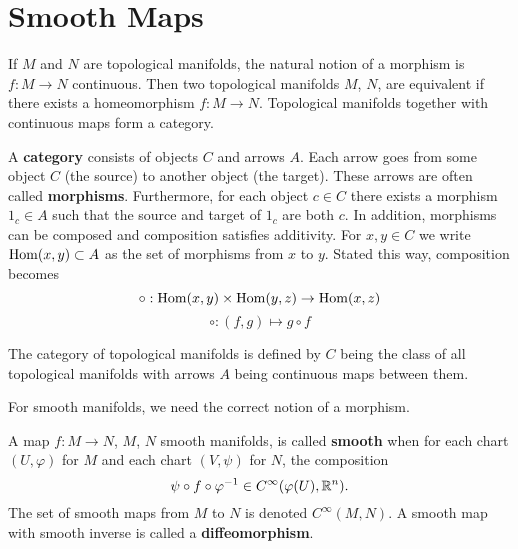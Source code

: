 \section{Smooth Maps}
If $M$ and $N$ are topological manifolds, the natural notion of a 
morphism is $f : M \to N$ continuous. Then two topological manifolds
$M$, $N$, are equivalent if there exists a homeomorphism $f : M \to N$. 
Topological manifolds together with continuous maps form a category.

\begin{definition}
A \textbf{category} consists of objects $C$ and arrows $A$. Each arrow
goes from some object $C$ (the source) to another object (the target).
These arrows are often called \textbf{morphisms}. Furthermore, for each
object $c \in C$ there exists a morphism $1_c \in A$ such that the source
and target of $1_c$ are both $c$. In addition, morphisms can be composed
and composition satisfies additivity. For $x, y \in C$ we write 
$\operatorname{Hom}(x,y) \subset A$ as the set of morphisms from $x$ to $y$. Stated this
way, composition becomes
\[ \circ : \operatorname{Hom}(x,y) \times \operatorname{Hom}(y,z) \to \operatorname{Hom}(x,z) \]
\[ \circ : (f,g) \mapsto g \circ f \]
\end{definition}

\begin{example}
The category of topological manifolds is defined by $C$ being the class of
all topological manifolds with arrows $A$ being continuous maps between them.
\end{example}

For smooth manifolds, we need the correct notion of a morphism.

\begin{definition}
A map $f : M \to N$, $M$, $N$ smooth manifolds, is called \textbf{smooth}
when for each chart $(U,\varphi)$ for $M$ and each chart $(V,\psi)$ for 
$N$, the composition
\[
\psi \circ f \circ \varphi^{-1} \in C^\infty(\varphi(U),\mathbb{R}^n).
\]
The set of smooth maps from $M$ to $N$ is denoted $C^\infty (M,N)$. A smooth
map with smooth inverse is called a \textbf{diffeomorphism}.
\end{definition}
